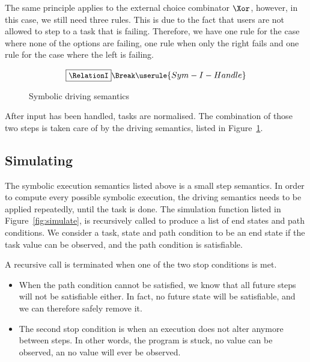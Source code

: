The same principle applies to the external choice combinator $\Xor$, however, in this case, we still need three rules.
This is due to the fact that users are not allowed to step to a task that is failing.
Therefore, we have one rule for the case where none of the options are failing, one rule when only the right fails and one rule for the case where the left is failing.


\begin{figure}
\begin{gather*}
  \small
  \boxed{\RelationI}\Break
  \userule{Sym-I-Handle}
\end{gather*}
\caption{Symbolic driving semantics}
\label{fig:driving}
\end{figure}

After input has been handled, tasks are normalised.
The combination of those two steps is taken care of by the driving semantics, listed in Figure~\ref{fig:driving}.


\subsection{Simulating}
\label{subsec:driving}

The symbolic execution semantics listed above is a small step semantics.
In order to compute every possible symbolic execution, the driving semantics needs to be applied repeatedly, until the task is done.
The simulation function listed in Figure~\ref{fig:simulate}, is recursively called to produce a list of end states and path conditions.
We consider a task, state and path condition to be an end state if the task value can be observed, and the path condition is satisfiable.

A recursive call is terminated when one of the two stop conditions is met.

\begin{itemize}
  \item When the path condition cannot be satisfied, we know that all future steps will not be satisfiable either.
  In fact, no future state will be satisfiable, and we can therefore safely remove it.
  \item The second stop condition is when an execution does not alter anymore between steps.
  In other words, the program is stuck, no value can be observed, an no value will ever be observed.
\end{itemize}

